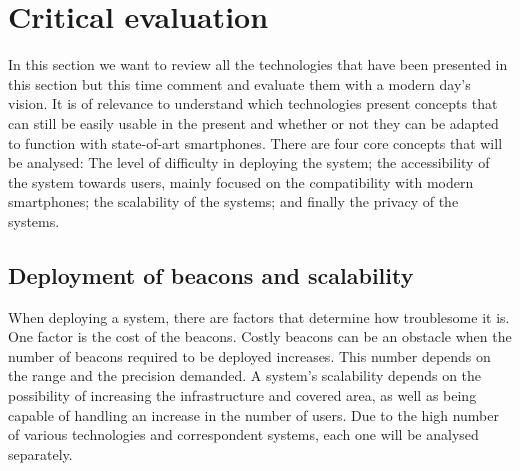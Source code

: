 \section{Critical evaluation} 
\label{sec:critical} 
 
 
 
 
In this section we want to review all the technologies that have been presented in this section but this time comment and evaluate them with a modern day's vision. It is of relevance to understand which technologies present concepts that can still be easily usable in the present and whether or not they can be adapted to function with state-of-art smartphones. There are four core concepts that will be analysed: The level of difficulty in deploying the system; the accessibility of the system towards users, mainly focused on the compatibility with modern smartphones; the scalability of the systems; and finally the privacy of the systems. 
 
 
\subsection{Deployment of beacons and scalability} 
\label{subsec:dep} 
 
 
When deploying a system, there are factors that determine how troublesome it is. One factor is the cost of the beacons. Costly beacons can be an obstacle when the number of beacons required to be deployed increases. This number depends on the range and the precision demanded. 
A system's scalability depends on the possibility of increasing the infrastructure and covered area, as well as being capable of handling an increase in the number of users.  
Due to the high number of various technologies and correspondent systems, each one will be analysed separately. 
 
